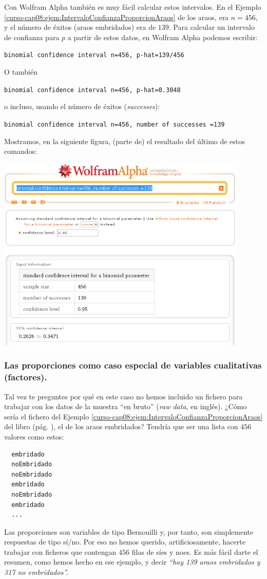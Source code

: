 \documentclass[10pt,a4paper]{article}\usepackage[]{graphicx}\usepackage[]{color}
\newcounter {cont01}
\begin{document}
Con Wolfram Alpha también es muy fácil calcular estos intervalos. En el Ejemplo \ref{curso-cap08:ejem:IntervaloConfianzaProporcionAraos} de los araos, era $n=456$, y el número de éxitos (araos embridados) era de $139$. Para calcular un intervalo de confianza para $p$ a partir de estos datos, en Wolfram Alpha podemos escribir:
\begin{center}
{\tt binomial confidence interval n=456, p-hat=139/456}
\end{center}
O también
\begin{center}
{\tt binomial confidence interval n=456, p-hat=0.3048}
\end{center}
o incluso, usando el número de éxitos ({\em successes}):
\begin{center}
{\tt binomial confidence interval n=456, number of successes =139}
\end{center}
Mostramos, en la siguiente figura, (parte de) el resultado del último de estos comandos:
    \begin{center}
    \includegraphics[width=12cm]{../fig/Tut08-06.png}
    \end{center}

\subsubsection*{Las proporciones como caso especial de variables cualitativas (factores).}

Tal vez te preguntes por qué en este caso no hemos incluido un fichero para trabajar con los datos de la muestra ``en bruto'' ({\em raw data}, en inglés). ¿Cómo sería el fichero del Ejemplo \ref{curso-cap08:ejem:IntervaloConfianzaProporcionAraos} del libro (pág. \pageref{curso-cap08:ejem:IntervaloConfianzaProporcionAraos}), el de los araos embridados? Tendría que ser una lista con $456$ valores como estos:
\begin{verbatim}
  embridado
  noEmbridado
  noEmbridado
  embridado
  noEmbridado
  embridado
  ...
\end{verbatim}
Las proporciones son variables de tipo Bernouilli y, por tanto, son simplemente respuestas de tipo sí/no. Por eso no hemos querido, artificiosamente, hacerte trabajar con ficheros que contengan $456$ filas de síes y noes. Es más fácil darte el resumen, como hemos hecho en ese ejemplo,  y decir {\em ``hay  139 araos embridados y 317 no embridados''.}
\end{document}

